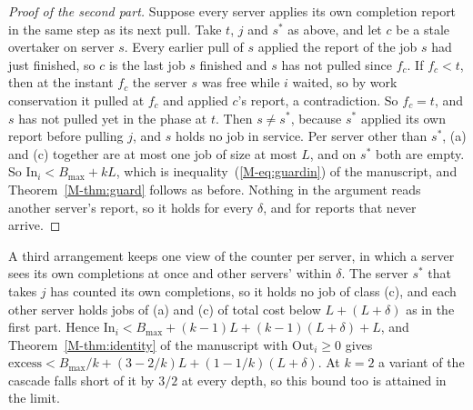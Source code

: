 \documentclass[mathematics,supfile,submit,moreauthors]{Definitions/mdpi}
\begin{document}
\begin{proof}[Proof of the second part]
Suppose every server applies its own completion report in the same step as its next
pull. Take $t$, $j$ and $s^*$ as above, and let $c$ be a stale overtaker on server $s$.
Every earlier pull of $s$ applied the report of the job $s$ had just finished, so $c$ is
the last job $s$ finished and $s$ has not pulled since $f_c$. If $f_c < t$, then at the
instant $f_c$ the server $s$ was free while $i$ waited, so by work conservation it
pulled at $f_c$ and applied $c$'s report, a contradiction. So $f_c = t$, and $s$ has
not pulled yet in the phase at $t$. Then $s \ne s^*$, because $s^*$ applied its own
report before pulling $j$, and $s$ holds no job in service. Per server other than
$s^*$, (a) and (c) together are at most one job of size at most $L$, and on $s^*$ both
are empty. So $\mathrm{In}_i < B_{\max} + kL$, which is inequality~(\ref*{M-eq:guardin}) of the
manuscript, and Theorem~\ref*{M-thm:guard} follows as before. Nothing in the argument reads another
server's report, so it holds for every $\delta$, and for reports that never arrive.
\end{proof}

A third arrangement keeps one view of the counter per server, in which a server sees
its own completions at once and other servers' within $\delta$. The server $s^*$ that
takes $j$ has counted its own completions, so it holds no job of class (c), and each other
server holds jobs of (a) and (c) of total cost below $L + (L + \delta)$ as in the first part.
Hence $\mathrm{In}_i < B_{\max} + (k-1)L + (k-1)(L + \delta) + L$, and
Theorem~\ref*{M-thm:identity} of the manuscript with $\mathrm{Out}_i \ge 0$ gives
$\mathrm{excess} < B_{\max}/k + (3 - 2/k)L + (1 - 1/k)(L + \delta)$. At $k = 2$ a
variant of the cascade falls short of it by $3/2$ at every depth, so this bound too is
attained in the limit.
\end{document}
